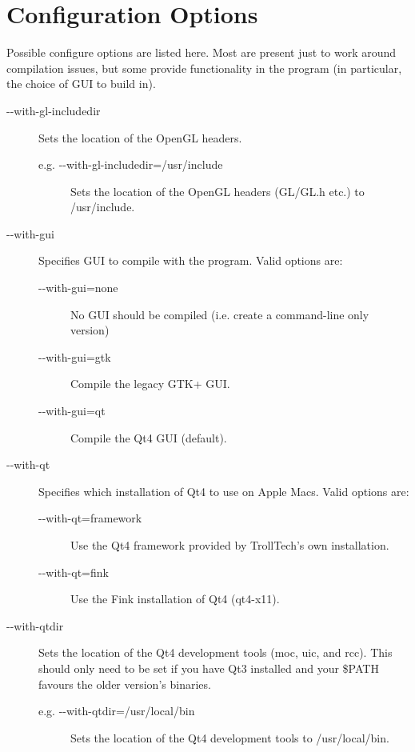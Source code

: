 \section{Configuration Options}

Possible {\sffamily configure} options are listed here. Most are present just to work around compilation issues, but some provide functionality in the program (in particular, the choice of GUI to build in).

\begin{description}

	\item[{-}{-}with-gl-includedir]
		Sets the location of the OpenGL headers.
	\begin{description}
		\item[e.g. {-}{-}with-gl-includedir=/usr/include]
			Sets the location of the OpenGL headers (GL/GL.h etc.) to /usr/include.
	\end{description}

	\item[{-}{-}with-gui] Specifies GUI to compile with the program. Valid options are:
	\begin{description}
		\item[{-}{-}with-gui=none\its]
			No GUI should be compiled (i.e. create a command-line only version)
		\item[{-}{-}with-gui=gtk\its]
			Compile the legacy GTK+ GUI.
		\item[{-}{-}with-gui=qt\its]
			Compile the Qt4 GUI (default).
	\end{description}

	\item[{-}{-}with-qt] Specifies which installation of Qt4 to use on Apple Macs. Valid options are:
	\begin{description}
		\item[{-}{-}with-qt=framework]
			Use the Qt4 framework provided by TrollTech's own installation.
		\item[{-}{-}with-qt=fink]
			Use the Fink installation of Qt4 (qt4-x11).
	\end{description}

	\item[{-}{-}with-qtdir] Sets the location of the Qt4 development tools ({\sffamily moc}, {\sffamily uic}, and {\sffamily rcc}). This should only need to be set if you have Qt3 installed and your \$PATH favours the older version's binaries.
	\begin{description}
		\item[e.g. {-}{-}with-qtdir=/usr/local/bin]
			Sets the location of the Qt4 development tools to /usr/local/bin.
	\end{description}

\end{description}


